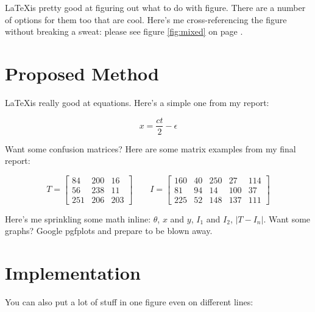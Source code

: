 \documentclass[a4paper,12pt,notitlepage]{article}
\begin{document}
	\LaTeX is pretty good at figuring out what to do with figure. There are a number of options for them too that are cool. Here's me cross-referencing the figure without breaking a sweat: please see figure \ref{fig:mixed} on page \pageref{fig:mixed}.

\pagebreak

\section{Proposed Method}

	\LaTeX is really good at equations. Here's a simple one from my report:

	$$x = \frac{ct}{2} - \epsilon$$

	Want some confusion matrices? Here are some matrix examples from my final report:

	\begin{equation*}
		T =
		\begin{bmatrix}
			84 & 200 & 16 \\
			56 & 238 & 11 \\
			251 & 206 & 203
		\end{bmatrix}
		\qquad
		I =
		\begin{bmatrix}
			160 & 40 & 250 & 27 & 114 \\
			81 & 94 & 14 & 100 & 37 \\
			225 & 52 & 148 & 137 & 111
		\end{bmatrix}
	\end{equation*}

	Here's me sprinkling some math inline: $\theta$, $x$ and $y$, $I_1$ and $I_2$, $|T - I_n|$. Want some graphs? Google pgfplots and prepare to be blown away.

\pagebreak

\section{Implementation}
	
	You can also put a lot of stuff in one figure even on different lines:
	
\end{document}
